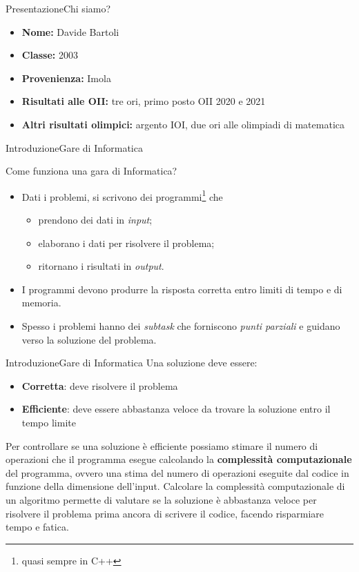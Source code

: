 \documentclass{beamer}
\begin{document}
\begin{frame}{Presentazione}{Chi siamo?}
    \begin{itemize}
        \item \textbf{Nome:} Davide Bartoli
        \item \textbf{Classe:} 2003
        \item \textbf{Provenienza:} Imola
        \item \textbf{Risultati alle OII:} tre ori, primo posto OII 2020 e 2021
        \item \textbf{Altri risultati olimpici:} argento IOI, due ori alle olimpiadi di matematica
    \end{itemize}
\end{frame}

\begin{frame}{Introduzione}{Gare di Informatica}
    \begin{block}{Come funziona una gara di Informatica?}
        \begin{itemize}
            \item Dati i problemi, si scrivono dei programmi\footnote{quasi sempre in \textsc{C++}} che
                \begin{itemize}
                    \item prendono dei dati in \emph{input};
                    \item elaborano i dati per risolvere il problema;
                    \item ritornano i risultati in \emph{output}.
                \end{itemize}
            \item I programmi devono produrre la risposta corretta entro limiti di tempo e di memoria.
            \item Spesso i problemi hanno dei \emph{subtask} che forniscono \emph{punti parziali} 
            e guidano verso la soluzione del problema.
        \end{itemize}
    \end{block}
\end{frame}

\begin{frame}{Introduzione}{Gare di Informatica}
    Una soluzione deve essere:
    \pause
    \begin{itemize}
        \item \textbf{Corretta}: deve risolvere il problema
        \pause
        \item \textbf{Efficiente}: deve essere abbastanza veloce da trovare la soluzione entro il tempo limite
    \end{itemize}
    \pause
    Per controllare se una soluzione \`e efficiente possiamo stimare il numero di operazioni che il programma esegue calcolando la \textbf{complessit\`a computazionale} del programma, ovvero una stima del 
    numero di operazioni eseguite dal codice in funzione della dimensione dell'input.
    \pause 
    \vfill
    Calcolare la complessit\`a computazionale di un algoritmo permette di valutare se la soluzione \`e abbastanza veloce per risolvere il problema prima ancora di 
    scrivere il codice, facendo risparmiare tempo e fatica.
\end{frame}
\end{document}
